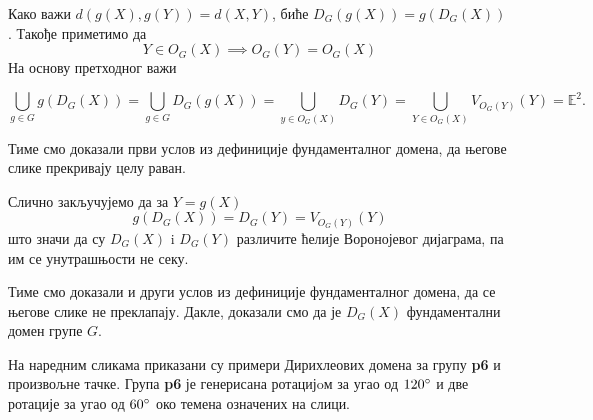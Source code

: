 \documentclass[12pt]{article}
\begin{document}
\noindent Како важи $d(g(X), g(Y))= d(X,Y)$, биће $D_G(g(X)) = g(D_G(X))$  .
Такође приметимо да $$Y \in  O_G(X) \implies O_G(Y) = O_G(X) $$
На основу претходног важи

$$\bigcup_{g\in G}g(D_G(X)) = \bigcup_{g\in G}D_G(g(X)) = \bigcup_{y \in O_G(X)}D_G(Y)
= \bigcup_{Y \in O_G(X)}V_{O_G(Y)}(Y) = \mathbb{E}^2.$$

\noindent Тиме смо доказали први услов из дефиниције фундаменталног домена, да његове слике прекривају целу раван.

\noindent Слично закључујемо да за $Y = g(X)$
$$g(D_G(X)) = D_G(Y) = V_{O_G(Y)}(Y)$$ што значи да су $D_G(X)$ i $D_G(Y)$ различите ћелије Воронојевог дијаграма, па им се унутрашњости не секу. 

Тиме смо доказали и други услов из дефиниције фундаменталног домена, да се његове слике не преклапају. Дакле, доказали смо да је $D_G(X)$ фундаментални домен групе $G$.

На наредним сликама приказани су примери Дирихлеових домена за групу \textbf{p6} и произвољне тачке. 
Група \textbf{p6} је генерисана ротацијoм за угао од $120\degree$ и две ротације за угао од $60\degree$ око темена означених на слици.
\end{document}
